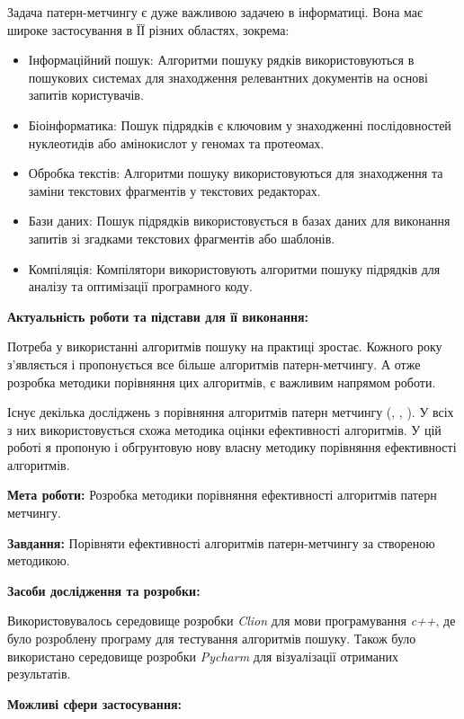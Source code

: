 \documentclass[a4paper,14pt]{extarticle} %
\begin{document}
	Задача патерн-метчингу є дуже важливою задачею в інформатиці. Вона має широке застосування в ЇЇ різних областях, зокрема:
\begin{itemize}
    \item Інформаційний пошук: Алгоритми пошуку рядків використовуються в пошукових системах для
	знаходження релевантних документів на основі запитів користувачів.
    \item Біоінформатика: Пошук підрядків є ключовим у знаходженні послідовностей нуклеотидів або амінокислот у геномах та протеомах. \cite{dna}
    \item Обробка текстів: Алгоритми пошуку використовуються для знаходження та заміни текстових фрагментів у текстових редакторах.
    \item Бази даних: Пошук підрядків використовується в базах даних для виконання запитів зі згадками текстових фрагментів або шаблонів.
    \item Компіляція: Компілятори використовують алгоритми пошуку підрядків для аналізу та оптимізації програмного коду.

\end{itemize}


\textbf{Актуальність роботи та підстави для її виконання:}

Потреба у використанні алгоритмів пошуку на практиці зростає. Кожного року з'являється і пропонується все більше алгоритмів патерн-метчингу. А отже розробка методики порівняння цих алгоритмів, є важливим напрямом роботи.

Існує декілька досліджень з порівняння алгоритмів патерн метчингу (\cite{smart}, \cite{exact}, \cite{experiment}). У всіх з них використовується схожа методика оцінки ефективності алгоритмів.
У цій роботі я пропоную і обгрунтовую нову власну методику порівняння ефективності алгоритмів.

\textbf{Мета роботи:} Розробка методики порівняння ефективності алгоритмів патерн метчингу.

\textbf{Завдання:} Порівняти ефективності алгоритмів патерн-метчингу за створеною методикою.

\textbf{Засоби дослідження та розробки:}

Використовувалось середовище розробки \textit{Clion} для мови програмування \textit{c++}, де було розроблену програму для тестування алгоритмів пошуку. Також було використано середовище розробки \textit{Pycharm} для візуалізації отриманих результатів.

\textbf{Можливі сфери застосування:}
\end{document}
